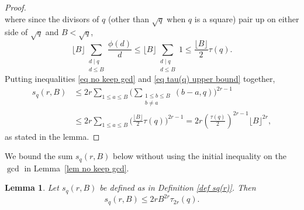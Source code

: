\documentclass[12pt]{amsart}
\theoremstyle{plain}
\newtheorem{lemma}[theorem]{Lemma}
\theoremstyle{definition}
\begin{document}
\begin{proof}
\[\]
where since the divisors of $q$ (other than $\sqrt{q}$ when $q$ is a square) pair up on either side of $\sqrt q$ and $B<\sqrt q$,
\begin{equation}
\label{eq tau(q) upper bound}
    \lfloor B\rfloor\sum_{\substack{d\mid q \\ d\le B}} \frac{\phi(d)}d 
    \le 
    \lfloor B\rfloor \sum_{\substack{d\mid q \\ d\le B}} 1 \le \frac{\lfloor B\rfloor}2\tau(q).
\end{equation}
Putting inequalities \eqref{eq no keep gcd} and \eqref{eq tau(q) upper bound} together,
\begin{align*} 
s_q(r, B) &\le 2r \sum_{1\le a\le B} \biggl( \sum_{\substack{1\le b\le B \\ b\ne a}} (b-a,q) \biggr)^{2r-1} \\
&\le 2r \sum_{1\le a\le B} \biggl(\frac{\lfloor B\rfloor}2\tau(q) \biggr)^{2r-1} = 2r \left(\frac{\tau(q)}{2}\right)^{2r-1}\lfloor B\rfloor^{2r}, 
\end{align*}
as stated in the lemma.
\end{proof}

We bound the sum $s_q(r, B)$ below without using the initial inequality on the $\gcd$ in Lemma~\ref{lem no keep gcd}.

\begin{lemma}\label{lem keep gcd}
Let $s_q(r, B)$ be defined as in Definition \ref{def sq(r)}. Then
$$s_q(r, B)\le 2r B^{2r} \tau_{2r}(q).$$
\end{lemma}
\end{document}
